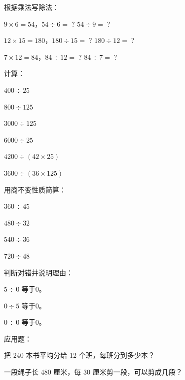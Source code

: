 \begin{exercise}
\item 根据乘法写除法：
  \begin{subexercise}
    \item $9\times6=54$，$54\div6=\;$? \quad $54\div9=\;$?
    \item $12\times15=180$，$180\div15=\;$? \quad $180\div12=\;$?
    \item $7\times12=84$，$84\div12=\;$? \quad $84\div7=\;$?
  \end{subexercise}

\item 计算：
  \begin{subexercise}
    \item $400\div25$
    \item $800\div125$
    \item $3000\div125$
    \item $6000\div25$
    \item $4200\div(42\times25)$
    \item $3600\div(36\times125)$
  \end{subexercise}

\item 用商不变性质简算：
  \begin{subexercise}
    \item $360\div45$
    \item $480\div32$
    \item $540\div36$
    \item $720\div48$
  \end{subexercise}

\item 判断对错并说明理由：
  \begin{subexercise}
    \item $5\div0$ 等于0。
    \item $0\div5$ 等于0。
    \item $0\div0$ 等于0。
  \end{subexercise}

\item 应用题：
  \begin{subexercise}
    \item 把 240 本书平均分给 12 个班，每班分到多少本？
    \item 一段绳子长 480 厘米，每 30 厘米剪一段，可以剪成几段？
  \end{subexercise}
\end{exercise}


